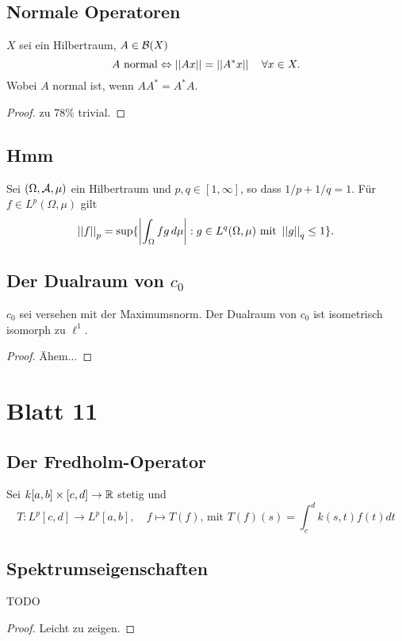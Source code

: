 \documentclass[FunkAnaSkript.tex]{subfiles}
\begin{document}
\subsection{ Normale Operatoren}
\label{B10.3}
	$X$ sei ein Hilbertraum, $A\in \mathcal{B}(X)$
	$$A \text{ normal} \Leftrightarrow \left\lvert \left\lvert  Ax  \right\rvert \right\rvert = \left\lvert \left\lvert  A^* x \right\rvert \right\rvert \quad \forall x\in X.$$
	Wobei $A$ normal ist, wenn $AA^* = A^* A$.
	
	\begin{proof}
	zu 78\% trivial.
	\end{proof}


\subsection{ Hmm}
\label{B10.4}
	Sei $(\Omega, \mathcal{A}, \mu )$ ein Hilbertraum und $p,q \in [1,\infty]$, so dass $1/p + 1/q = 1$. Für $f\in L^p(\Omega , \mu )$ gilt
	$$ \left\lvert \left\lvert f \right\rvert \right\rvert_p = \sup \{ \left\lvert  \int_{\Omega } fg\,d\mu  \right\rvert : g \in L^q(\Omega, \mu ) \text{ mit } \left\lvert \left\lvert g \right\rvert \right\rvert_q \leq 1 \}.$$
	
	
\subsection{ Der Dualraum von $c_0$}
\label{B10.5}
	$c_0$ sei versehen mit der Maximumsnorm. Der Dualraum von $c_0$ ist isometrisch isomorph zu $\ell^1$.
	
	\begin{proof}
	Ähem...
	\end{proof}


\newpage
\section{ Blatt 11}

\subsection{ Der Fredholm-Operator}
\label{B11.1}
	Sei $k [a,b] \times [c,d] \to\mathbb{R}$ stetig und
	$$ T : L^p[c,d] \to L^p[a,b], \quad f \mapsto T(f) \text{, mit } T(f)(s)= \int^d_c k(s,t) f(t) dt$$


\subsection{ Spektrumseigenschaften}
\label{B11.2}
TODO
	\begin{proof}
	Leicht zu zeigen.
	\end{proof}
\end{document}
